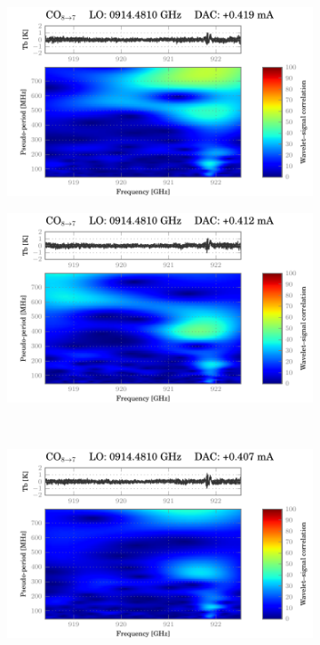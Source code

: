 \begin{figure}
    \centering
    \begin{subfigure}[b]{0.5\textwidth}
        \includegraphics[width=\textwidth]{50015e1d_WBS-H-USB_04-15_fit_wavelet}
    \end{subfigure}%
    \hfill
    \begin{subfigure}[b]{0.5\textwidth}
        \includegraphics[width=\textwidth]{50015e1d_WBS-H-USB_04-16_fit_wavelet}
    \end{subfigure}%
    \\
    \begin{subfigure}[b]{0.5\textwidth}
        \includegraphics[width=\textwidth]{50015e1d_WBS-H-USB_04-17_fit_wavelet}

\end{subfigure}
\end{figure}
